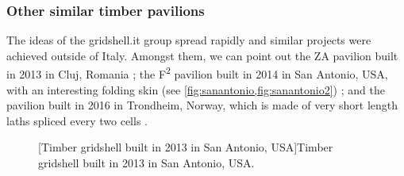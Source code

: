 \subsubsection{Other similar timber pavilions}
The ideas of the gridshell.it group spread rapidly and similar projects were achieved outside of Italy. Amongst them, we can point out the ZA pavilion built in 2013 in Cluj, Romania \cite{Naicu2014} ; the F\textsuperscript{2} pavilion built in 2014 in San Antonio, USA, with an interesting folding skin (see \cref{fig:sanantonio,fig:sanantonio2}) ; and the pavilion built in 2016 in Trondheim, Norway, which is made of very short length laths spliced every two cells \cite{Mork2016,Labonnote2016}.
\begin{figure}[h]
		\hspace*{\fill}
		\vspace{10pt}
		[Timber gridshell built in 2013 in San Antonio, USA]{Timber gridshell built in 2013 in San Antonio, USA.}
		\label{fig:otherpav}    
\end{figure}

